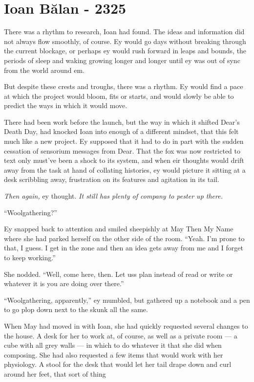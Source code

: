 \hypertarget{ioan-bux103lan—2325}{%
\chapter{Ioan Bălan - 2325}\label{ioan-bux103lan—2325}}

There was a rhythm to research, Ioan had found. The ideas and information did not always flow smoothly, of course. Ey would go days without breaking through the current blockage, or perhaps ey would rush forward in leaps and bounds, the periods of sleep and waking growing longer and longer until ey was out of sync from the world around em.

But despite these crests and troughs, there was a rhythm. Ey would find a pace at which the project would bloom, fits or starts, and would slowly be able to predict the ways in which it would move.

There had been work before the launch, but the way in which it shifted Dear's Death Day, had knocked Ioan into enough of a different mindset, that this felt much like a new project. Ey supposed that it had to do in part with the sudden cessation of sensorium messages from Dear. That the fox was now restricted to text only must've been a shock to its system, and when eir thoughts would drift away from the task at hand of collating histories, ey would picture it sitting at a desk scribbling away, frustration on its features and agitation in its tail.

\emph{Then again,} ey thought. \emph{It still has plenty of company to pester up there.}

``Woolgathering?''

Ey snapped back to attention and smiled sheepishly at May Then My Name where she had parked herself on the other side of the room. ``Yeah. I'm prone to that, I guess. I get in the zone and then an idea gets away from me and I forget to keep working.''

She nodded. ``Well, come here, then. Let uss plan instead of read or write or whatever it is you are doing over there.''

``Woolgathering, apparently,'' ey mumbled, but gathered up a notebook and a pen to go plop down next to the skunk all the same.

When May had moved in with Ioan, she had quickly requested several changes to the house. A desk for her to work at, of course, as well as a private room — a cube with all grey walls — in which to do whatever it that she did when composing. She had also requested a few items that would work with her physiology. A stool for the desk that would let her tail drape down and curl around her feet, that sort of thing


